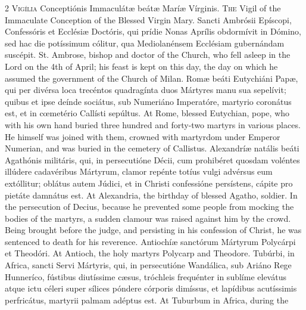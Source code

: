 \begin{paracol}{2}
\lettrine[lines=2]{V}{igília} Conceptiónis 
 Immaculátæ beátæ Maríæ Vírginis.
\switchcolumn
{}
\lettrine[lines=2]{T}{he} Vigil of the Immaculate 
 Conception of the Blessed Virgin Mary.
\switchcolumn*
{}
Sancti Ambrósii 
 Epíscopi, Confessóris et Ecclésiæ Doctóris, qui prídie Nonas Aprílis 
 obdormívit in Dómino, sed hac die potíssimum cólitur, qua Mediolanénsem 
 Ecclésiam gubernándam suscépit.
\switchcolumn
{}
St. Ambrose, bishop and doctor of 
 the Church, who fell asleep in the Lord on the 4th of April; his feast is 
 kept on this day, the day on which he assumed the government of the Church 
 of Milan.
\switchcolumn*
{}
Romæ beáti Eutychiáni 
 Papæ, qui per divérsa loca trecéntos quadragínta duos Mártyres manu sua 
 sepelívit; quibus et ipse deínde sociátus, sub Numeriáno Imperatóre, 
 martyrio coronátus est, et in cœmetério Callísti sepúltus.
\switchcolumn
{}
At Rome, blessed Eutychian, pope, 
 who with his own hand buried three hundred and forty-two martyrs in various 
 places. He himself was joined with them, crowned with martyrdom under 
 Emperor Numerian, and was buried in the cemetery of Callistus.
\switchcolumn*
{}
Alexandríæ natális 
 beáti Agathónis militáris, qui, in persecutióne Décii, cum prohibéret 
 quosdam voléntes illúdere cadavéribus Mártyrum, clamor repénte totíus vulgi 
 advérsus eum extóllitur; oblátus autem Júdici, et in Christi confessióne 
 persístens, cápite pro pietáte damnátus est.
\switchcolumn
{}
At Alexandria, the birthday of 
 blessed Agatho, soldier. In the persecution of Decius, because he 
 prevented some people from mocking the bodies of the martyrs, a sudden 
 clamour was raised against him by the crowd. Being brought before the 
 judge, and persisting in his confession of Christ, he was sentenced to death 
 for his reverence.
\switchcolumn*
{}
Antiochíæ sanctórum 
 Mártyrum Polycárpi et Theodóri.
\switchcolumn
{}
At Antioch, the holy martyrs 
 Polycarp and Theodore.
\switchcolumn*
{}
Tubúrbi, in Africa, 
 sancti Servi Mártyris, qui, in persecutióne Wandálica, sub Ariáno Rege 
 Hunneríco, fústibus diutíssime cæsus, tróchleis frequénter in sublíme elevátus atque ictu céleri super sílices póndere córporis dimíssus, et 
 lapídibus acutíssimis perfricátus, martyrii palmam adéptus est.
\switchcolumn
{}
At Tuburbum in Africa, during the 

\end{paracol}
